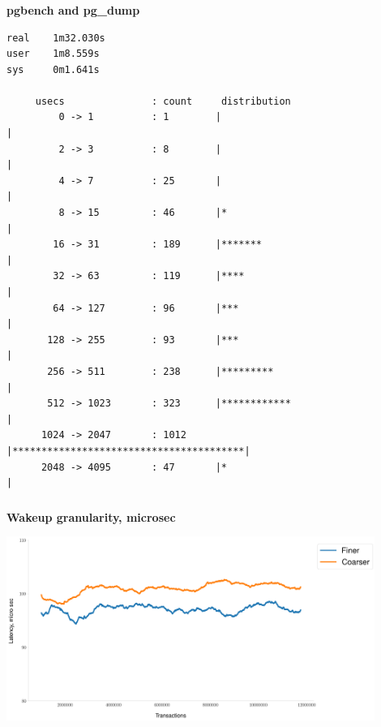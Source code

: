 \documentclass[usenames,dvipsnames, 18pt, compress, aspectratio=169]{beamer}
\begin{document}
\begin{frame}[fragile]{}
    \frametitle{}
    \begin{center}
    \textbf{pgbench and pg\_dump}

    \begin{verbatim}
real    1m32.030s
user    1m8.559s
sys     0m1.641s

     usecs               : count     distribution
         0 -> 1          : 1        |                                        |
         2 -> 3          : 8        |                                        |
         4 -> 7          : 25       |                                        |
         8 -> 15         : 46       |*                                       |
        16 -> 31         : 189      |*******                                 |
        32 -> 63         : 119      |****                                    |
        64 -> 127        : 96       |***                                     |
       128 -> 255        : 93       |***                                     |
       256 -> 511        : 238      |*********                               |
       512 -> 1023       : 323      |************                            |
      1024 -> 2047       : 1012     |****************************************|
      2048 -> 4095       : 47       |*                                       |
        \end{verbatim}

    \end{center}
\end{frame}

\begin{frame}
    \frametitle{}
    \begin{center}
    \textbf{Wakeup granularity, microsec}

        \vspace{0.5cm}
        \includegraphics[width=0.9\textwidth,center]{wakeup_granularity_2.png}

    \end{center}
\end{frame}
\end{document}
